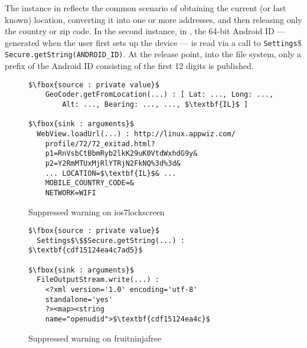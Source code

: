 The instance in  reflects the common scenario of obtaining the current (or last known) location, converting it into one or more addresses, and then releasing only the country or zip code. In the second instance, in , the 64-bit Android ID --- generated when the user first sets up the device --- is read via a call to \texttt{Settings$\$$Secure.getString(ANDROID\_ID)}. At the release point, into the file system, only a prefix of the Android ID consisting of the first 12 digits is published.

\begin{figure}
\begin{lstlisting}[numbers=none]
$\fbox{source : private value}$
    GeoCoder.getFromLocation(...) : [ Lat: ..., Long: ...,
	    Alt: ..., Bearing: ..., ..., $\textbf{IL}$ ]
	    
$\fbox{sink : arguments}$
  WebView.loadUrl(...) : http://linux.appwiz.com/
    profile/72/72_exitad.html?
    p1=RnVsbCtBbmRyb2lkK29uK0VtdWxhdG9y&
    p2=Y2RmMTUxMjRlYTRjN2FkNQ%3d%3d&
    ... LOCATION=$\textbf{IL}$& ...
    MOBILE_COUNTRY_CODE=&
    NETWORK=WIFI
\end{lstlisting}
\caption{\label{Fi:ios7}Suppressed warning on ios7lockscreen}
\end{figure}

\begin{figure}
\begin{lstlisting}[numbers=none]
$\fbox{source : private value}$
  Settings$\$$Secure.getString(...) : $\textbf{cdf15124ea4c7ad5}$
  
$\fbox{sink : arguments}$
  FileOutputStream.write(...) :
    <?xml version='1.0' encoding='utf-8'
    standalone='yes'
    ?><map><string
    name="openudid">$\textbf{cdf15124ea4c}$
\end{lstlisting}
\caption{\label{Fi:fruitninja}Suppressed warning on fruitninjafree}
\end{figure}

